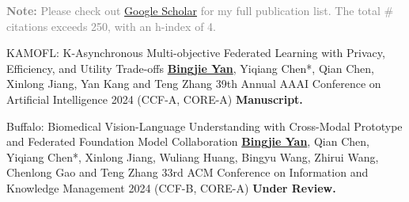 

\begin{cvparagraph}
\textcolor{gray}{\textbf{Note:} Please check out \href{https://scholar.google.com/citations?hl=en&user=DVsgN1sAAAAJ}{Google Scholar} for my full publication list.
The total \# citations exceeds 250, with an h-index of 4.}
\end{cvparagraph}
\vspace{-1.0mm}
\begin{cvpublications}

\cvpublication
{KAMOFL: K-Asynchronous Multi-objective Federated Learning with Privacy, Efficiency, and Utility Trade-offs} %
{\underline{\textbf{Bingjie Yan}}, Yiqiang Chen*, Qian Chen, Xinlong Jiang, Yan Kang and Teng Zhang} %
{39th Annual AAAI Conference on Artificial Intelligence} %
{2024} %
{(CCF-A, CORE-A\ast)} %
{\textbf{Manuscript.}} %

\cvpublication
{Buffalo: Biomedical Vision-Language Understanding with Cross-Modal Prototype and Federated Foundation Model Collaboration} %
{\underline{\textbf{Bingjie Yan}}, Qian Chen, Yiqiang Chen*, Xinlong Jiang, Wuliang Huang, Bingyu Wang, Zhirui Wang, Chenlong Gao and Teng Zhang} %
{33rd ACM Conference on Information and Knowledge Management} %
{2024} %
{(CCF-B, CORE-A)}
{\textbf{Under Review.}} %



\end{cvpublications}

